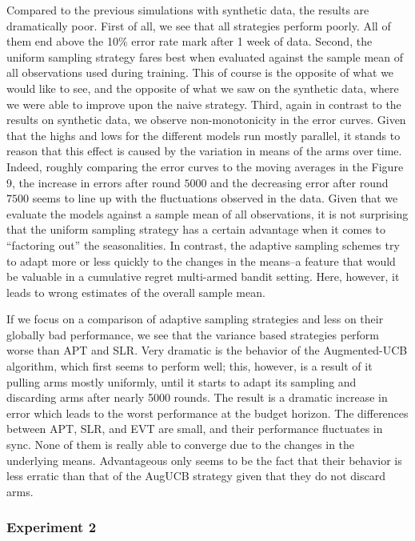 \documentclass[11pt,]{article}
\begin{document}
Compared to the previous simulations with synthetic data, the results
are dramatically poor. First of all, we see that all strategies perform
poorly. All of them end above the 10\% error rate mark after 1 week of
data. Second, the uniform sampling strategy fares best when evaluated
against the sample mean of all observations used during training. This
of course is the opposite of what we would like to see, and the opposite
of what we saw on the synthetic data, where we were able to improve upon
the naive strategy. Third, again in contrast to the results on synthetic
data, we observe non-monotonicity in the error curves. Given that the
highs and lows for the different models run mostly parallel, it stands
to reason that this effect is caused by the variation in means of the
arms over time. Indeed, roughly comparing the error curves to the moving
averages in the Figure 9, the increase in errors after round \(5000\)
and the decreasing error after round \(7500\) seems to line up with the
fluctuations observed in the data. Given that we evaluate the models
against a sample mean of all observations, it is not surprising that the
uniform sampling strategy has a certain advantage when it comes to
``factoring out'' the seasonalities. In contrast, the adaptive sampling
schemes try to adapt more or less quickly to the changes in the means--a
feature that would be valuable in a cumulative regret multi-armed bandit
setting. Here, however, it leads to wrong estimates of the overall
sample mean.

If we focus on a comparison of adaptive sampling strategies and less on
their globally bad performance, we see that the variance based
strategies perform worse than APT and SLR. Very dramatic is the behavior
of the Augmented-UCB algorithm, which first seems to perform well; this,
however, is a result of it pulling arms mostly uniformly, until it
starts to adapt its sampling and discarding arms after nearly 5000
rounds. The result is a dramatic increase in error which leads to the
worst performance at the budget horizon. The differences between APT,
SLR, and EVT are small, and their performance fluctuates in sync. None
of them is really able to converge due to the changes in the underlying
means. Advantageous only seems to be the fact that their behavior is
less erratic than that of the AugUCB strategy given that they do not
discard arms.

\subsubsection{Experiment 2}\label{experiment-2}
\end{document}
